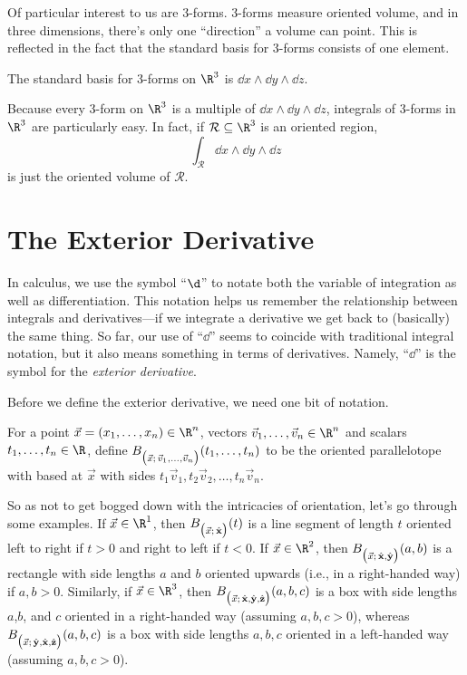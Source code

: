 Of particular interest to us are 3-forms.  3-forms measure oriented volume,
and in three dimensions, there's only one ``direction'' a volume can point.
This is reflected in the fact that the standard basis for 3-forms consists of
one element.

\begin{definition}
	The standard basis for 3-forms on $\R^3$ is 
	$\dd x\wedge \dd y\wedge \dd z$.
\end{definition}

Because every 3-form on $\R^3$ is
a multiple of $\dd x\wedge \dd y\wedge \dd z$, integrals of 3-forms in $\R^3$
are particularly easy.  In fact, if $\mathcal R\subseteq \R^3$ is an oriented region,
\[
	\int_{\mathcal R} \dd x\wedge \dd y\wedge \dd z
\]
is just the oriented volume of $\mathcal R$.

\section{The Exterior Derivative}

In calculus, we use the symbol ``$\d$'' to notate both the variable of integration
as well as differentiation.  This notation helps us remember the relationship 
between integrals and derivatives---if we integrate a derivative we get back
to (basically) the same thing.  So far, our use of ``$\dd$'' seems to coincide
with traditional integral notation, but it also means something in terms
of derivatives.  Namely, ``$\dd$'' is the symbol for the \emph{exterior derivative}.

Before we define the exterior derivative, we need one bit of notation.
\begin{definition}
	For a point $\vec x=(x_1,\ldots,x_n)\in \R^n$, vectors
	$\vec v_1,\ldots,\vec v_n\in\R^n$ 
	and scalars $t_1,\ldots, t_n\in \R$, define 
	$B_{\big(\vec x;\, \vec v_1,\ldots, \vec v_n\big)}(t_1,\ldots, t_n)$ 
	to be the oriented parallelotope with based at $\vec x$ with
	sides $t_1\vec v_1, t_2\vec v_2, \ldots, t_n\vec v_n$.
\end{definition}

So as not to get bogged down with the intricacies of orientation, let's go
through some examples.  If $\vec x\in \R^1$, then $B_{\big(\vec x;\, {\hat {\mathbf x}}\big)}(t)$ is a line
segment of length $t$ oriented left to right if $t>0$ and right to left if $t<0$.
If $\vec x\in \R^2$, then $B_{\big(\vec x;\, {\hat {\mathbf x}},{\hat {\mathbf y}}\big)}(a,b)$ 
is a rectangle with side lengths
$a$ and $b$ oriented upwards (i.e., in a right-handed way) if $a,b>0$.  Similarly,
if $\vec x\in\R^3$, then $B_{\big(\vec x;\, {\hat {\mathbf x}},{\hat {\mathbf y}},{\hat {\mathbf z}}\big)}(a,b,c)$ 
is a box with side lengths $a$,$b$,
and $c$ oriented in a right-handed way (assuming $a,b,c>0$), whereas 
$B_{\big(\vec x;\, {\hat {\mathbf y}},{\hat {\mathbf x}},{\hat {\mathbf z}}\big)}(a,b,c)$ is a box with side lengths $a,b,c$
oriented in a left-handed way (assuming $a,b,c>0$).


